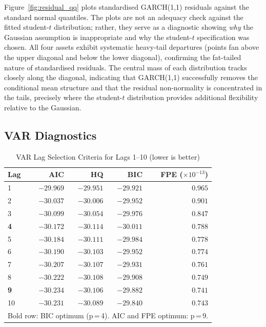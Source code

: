 Figure~\ref{fig:residual_qq} plots standardised GARCH(1,1) residuals against
the standard normal quantiles. The plots are not an adequacy check against the
fitted student-$t$ distribution; rather, they serve as a diagnostic showing
\emph{why} the Gaussian assumption is inappropriate and why the student-$t$
specification was chosen. All four assets exhibit systematic heavy-tail
departures (points fan above the upper diagonal and below the lower diagonal),
confirming the fat-tailed nature of standardised residuals. The central mass of
each distribution tracks closely along the diagonal, indicating that
GARCH(1,1) successfully removes the conditional mean structure and that the
residual non-normality is concentrated in the tails, precisely where the
student-$t$ distribution provides additional flexibility relative to the
Gaussian.

\subsection{VAR Diagnostics}

\begin{table}[H]
\centering
\caption{VAR Lag Selection Criteria for Lags 1--10 (lower is better)}
\label{tab:lag_selection}
\begin{tabular}{lrrrr}
\hline
Lag & AIC & HQ & BIC & FPE ($\times 10^{-13}$) \\
\hline
1  & $-29.969$ & $-29.951$ & $-29.921$ & $0.965$ \\
2  & $-30.037$ & $-30.006$ & $-29.952$ & $0.901$ \\
3  & $-30.099$ & $-30.054$ & $-29.976$ & $0.847$ \\
\textbf{4}  & $\mathbf{-30.172}$ & $\mathbf{-30.114}$ & $\mathbf{-30.011}$ & $\mathbf{0.788}$ \\
5  & $-30.184$ & $-30.111$ & $-29.984$ & $0.778$ \\
6  & $-30.190$ & $-30.103$ & $-29.952$ & $0.774$ \\
7  & $-30.207$ & $-30.107$ & $-29.931$ & $0.761$ \\
8  & $-30.222$ & $-30.108$ & $-29.908$ & $0.749$ \\
\textbf{9}  & $-30.234$ & $-30.106$ & $-29.882$ & $0.741$ \\
10 & $-30.231$ & $-30.089$ & $-29.840$ & $0.743$ \\
\hline
\multicolumn{5}{l}{\small Bold row: BIC optimum (p\,=\,4). AIC and FPE optimum: p\,=\,9.}
\end{tabular}
\end{table}

